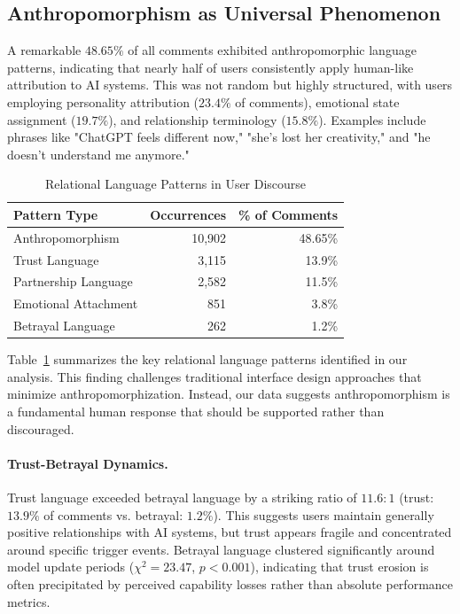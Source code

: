 \documentclass{article}
\begin{document}
\subsection{Anthropomorphism as Universal Phenomenon}

A remarkable $48.65\%$ of all comments exhibited anthropomorphic language patterns, indicating that nearly half of users consistently apply human-like attribution to AI systems. This was not random but highly structured, with users employing personality attribution ($23.4\%$ of comments), emotional state assignment ($19.7\%$), and relationship terminology ($15.8\%$). Examples include phrases like "ChatGPT feels different now," "she's lost her creativity," and "he doesn't understand me anymore."

\begin{table}[htbp]
\centering
\label{tab:relational_patterns}
\begin{tabular}{@{}lrr@{}}
\toprule
Pattern Type & Occurrences & \% of Comments \\
\midrule
Anthropomorphism & 10,902 & 48.65\% \\
Trust Language & 3,115 & 13.9\% \\
Partnership Language & 2,582 & 11.5\% \\
Emotional Attachment & 851 & 3.8\% \\
Betrayal Language & 262 & 1.2\% \\
\bottomrule
\end{tabular}
\caption{Relational Language Patterns in User Discourse}
\end{table}
Table~\ref{tab:relational_patterns} summarizes the key relational language patterns identified in our analysis. This finding challenges traditional interface design approaches that minimize anthropomorphization. Instead, our data suggests anthropomorphism is a fundamental human response that should be supported rather than discouraged.

\paragraph{Trust-Betrayal Dynamics.}
Trust language exceeded betrayal language by a striking ratio of $11.6:1$ (trust: $13.9\%$ of comments vs. betrayal: $1.2\%$). This suggests users maintain generally positive relationships with AI systems, but trust appears fragile and concentrated around specific trigger events. Betrayal language clustered significantly around model update periods ($\chi^2=23.47$, $p<0.001$), indicating that trust erosion is often precipitated by perceived capability losses rather than absolute performance metrics.
\end{document}
